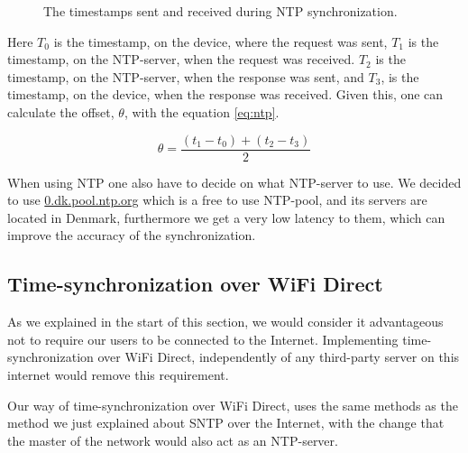 \begin{figure}[htb]
    \centering
    \caption{The timestamps sent and received during \ac{NTP} synchronization.}
    \label{fig:ntp_packets}
\end{figure}

Here $T_0$ is the timestamp, on the device, where the request was sent, $T_1$ is the timestamp, on the \ac{NTP}-server, when the request was received.
$T_2$ is the timestamp, on the \ac{NTP}-server, when the response was sent, and $T_3$, is the timestamp, on the device, when the response was received.
Given this, one can calculate the offset, $\theta$, with the equation \ref{eq:ntp}.

\begin{equation}\label{eq:ntp}
    \theta = \frac{(t_1 - t_0)+(t_2 - t_3)}{2}
\end{equation}

When using \ac{NTP} one also have to decide on what \ac{NTP}-server to use.
We decided to use \url{0.dk.pool.ntp.org} which is a free to use \ac{NTP}-pool, and its servers are located in Denmark, furthermore we get a very low latency to them, which can improve the accuracy of the synchronization.

\subsection{Time-synchronization over WiFi Direct}
As we explained in the start of this section, we would consider it advantageous not to require our users to be connected to the Internet.
Implementing time-synchronization over WiFi Direct, independently of any third-party server on this internet would remove this requirement.

Our way of time-synchronization over WiFi Direct, uses the same methods as the method we just explained about \ac{SNTP} over the Internet, with the change that the master of the network would also act as an \ac{NTP}-server.

